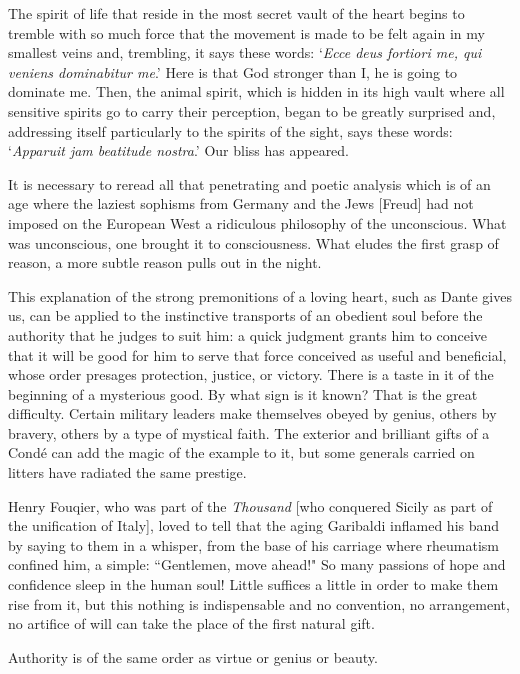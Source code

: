 \begin{quotex}
The spirit of life that reside in the most secret vault of the heart begins to tremble with so much force that the movement is made to be felt again in my smallest veins and, trembling, it says these words: `\emph{Ecce deus fortiori me, qui veniens dominabitur me}.' Here is that God stronger than I, he is going to dominate me. Then, the animal spirit, which is hidden in its high vault where all sensitive spirits go to carry their perception, began to be greatly surprised and, addressing itself particularly to the spirits of the sight, says these words: `\emph{Apparuit jam beatitude nostra}.' Our bliss has appeared. 

\end{quotex}
It is necessary to reread all that penetrating and poetic analysis which is of an age where the laziest sophisms from Germany and the Jews [Freud] had not imposed on the European West a ridiculous philosophy of the unconscious. What was unconscious, one brought it to consciousness. What eludes the first grasp of reason, a more subtle reason pulls out in the night.

This explanation of the strong premonitions of a loving heart, such as Dante gives us, can be applied to the instinctive transports of an obedient soul before the authority that he judges to suit him: a quick judgment grants him to conceive that it will be good for him to serve that force conceived as useful and beneficial, whose order presages protection, justice, or victory. There is a taste in it of the beginning of a mysterious good. By what sign is it known? That is the great difficulty. Certain military leaders make themselves obeyed by genius, others by bravery, others by a type of mystical faith. The exterior and brilliant gifts of a Condé can add the magic of the example to it, but some generals carried on litters have radiated the same prestige.

Henry Fouqier, who was part of the \emph{Thousand} [who conquered Sicily as part of the unification of Italy], loved to tell that the aging Garibaldi inflamed his band by saying to them in a whisper, from the base of his carriage where rheumatism confined him, a simple: ``Gentlemen, move ahead!" So many passions of hope and confidence sleep in the human soul! Little suffices a little in order to make them rise from it, but this nothing is indispensable and no convention, no arrangement, no artifice of will can take the place of the first natural gift.

Authority is of the same order as virtue or genius or beauty.

